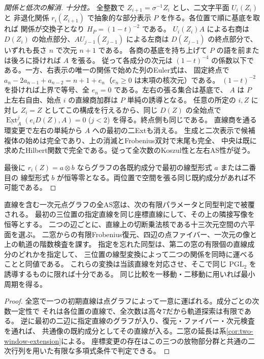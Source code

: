 \begin{proof}[関係と低次の解消]
\smallskip
\noindent\textit{十分性。}
全整数で $Z_{i+1}=\sigma^{-1}Z_i$ とし、二文字平面 $U_i(Z_i)$ と
非退化関係 $r_i(Z_{i+1})$ で抽象的な部分表示 $P$ を作る。各位置で順に基底を取れば
関係が交換子となり $H_P=(1-t)^{-2}$ である。
$U_i(Z_i)A$ による右商は $D(Z_i)$ の始点部分、$A U_{j-1}(Z_{j-1})$ による左商は
$D(Z_{j-1})$ の終点部分で、いずれも長さ $n$ で次元 $n+1$ である。
各商の基底を持ち上げて $P$ の語を前または後ろに掛ければ $A$ を張る。
従って各成分の次元は $(1-t)^{-4}$ の係数以下である。一方、右表示の唯一の関係で始めた列のEuler式は、
固定終点で $a_n-2a_{n-1}+a_{n-2}=n+1+e_n$（$e_n\ge0$ は末項の核次元）である。
$(1-t)^{-2}$ を掛ければ上界で等号、全 $e_n=0$ である。左右の張る集合は基底で、
$A$ は $P$ 上左右自由、始点 $i$ の直線商加群は $P$ 単純の誘導となる。
任意の所定の $i,Z$ に対し $Z_i=Z$ としてこの構成を行えるから、同じ $D(Z)$ の全始点で
$\underline{\operatorname{Ext}}^j_A(e_iD(Z),A)=0$ ($j<2$) を得る。終点側も同じである。
直線商を通る環変更で左右の単純から $A$ への最初の二Extも消える。
生成と二次表示で候補複体の始めは完全であり、上の消滅とFrobenius双対で末尾も完全、
中央は既に求めたHilbert関数で完全である。従って全次数のKoszul性と左右AS性が従う。

最後に $r_i(Z)=a\otimes b$ ならグラフの各既約成分で最初の線型形式 $a$ または二番目の
線型形式 $b$ が恒等零となる。両位置で空間を張る同じ既約成分があれば不可能である。
\end{proof}

\begin{corollary}\label{cor:line-component-atlas}
直線を含む一次元点グラフの全AS窓は、次の有限パラメータと同型判定で被覆される。
最初の三位置の指定直線を同じ座標直線にして、その上の隣接写像を恒等とする。
二つの辺ごとに、直線上の切断乗法核である十三次元空間の六平面を選ぶ。
二窓からの有限Frobenius復元、四辺の点ファイバー、一次元の像と上の軌道の階数検査を課す。
指定を忘れた同型は、第二の窓の有限個の直線成分のどれかを指定して、
三位置の線型変換によって二つの関係を同時に運べることと同値である。
これらの変換は当該直線を対応させ、そこで同じ $\mathrm{PGL}_2$ を誘導するものに限れば十分である。
同じ比較を一移動・二移動に用いれば最小周期を得る。
\end{corollary}
\begin{proof}
全窓で一つの初期直線は点グラフによって一意に運ばれる。成分ごとの次数一定性で
それは各位置の直線で、全次数は高々7だから軌道探索は有限である。
逆に最初の二辺に指定直線のグラフが入り、復元・ファイバー・次元検査を通れば、
共通像の既約成分としてその直線が入る。二窓の延長は系\ref{cor:two-window-extension}による。
座標変更の存在はこの三つの放物部分群と共通の二次行列を用いた有限な多項式条件で判定できる。
\end{proof}

